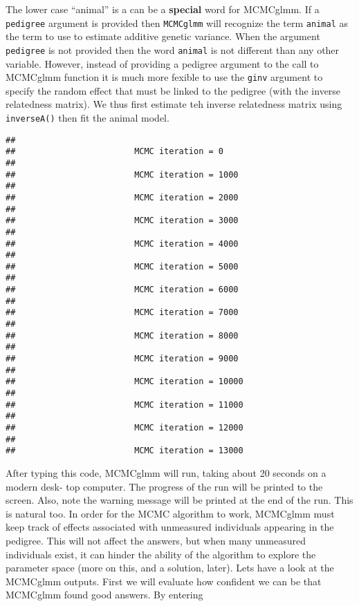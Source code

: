 \documentclass[
  12pt,
]{book}
\newenvironment{Shaded}{\begin{snugshade}}{\end{snugshade}}
\newcommand{\AttributeTok}[1]{\textcolor[rgb]{0.77,0.63,0.00}{#1}}
\newcommand{\DecValTok}[1]{\textcolor[rgb]{0.00,0.00,0.81}{#1}}
\newcommand{\FloatTok}[1]{\textcolor[rgb]{0.00,0.00,0.81}{#1}}
\newcommand{\FunctionTok}[1]{\textcolor[rgb]{0.00,0.00,0.00}{#1}}
\newcommand{\NormalTok}[1]{#1}
\newcommand{\OtherTok}[1]{\textcolor[rgb]{0.56,0.35,0.01}{#1}}
\newcommand{\SpecialCharTok}[1]{\textcolor[rgb]{0.00,0.00,0.00}{#1}}
\begin{document}
The lower case ``animal'' is a can be a \textbf{special} word for MCMCglmm. If a \texttt{pedigree} argument is provided then \texttt{MCMCglmm} will recognize the term \texttt{animal} as the term to use to estimate additive genetic variance. When the argument \texttt{pedigree} is not provided then the word \texttt{animal} is not different than any other variable. However, instead of providing a pedigree argument to the call to MCMCglmm function it is much more fexible to use the \texttt{ginv} argument to specify the random effect that must be linked to the pedigree (with the inverse relatedness matrix). We thus first estimate teh inverse relatedness matrix using \texttt{inverseA()} then fit the animal model.

\begin{Shaded}
\end{Shaded}

\begin{verbatim}
## 
##                        MCMC iteration = 0
## 
##                        MCMC iteration = 1000
## 
##                        MCMC iteration = 2000
## 
##                        MCMC iteration = 3000
## 
##                        MCMC iteration = 4000
## 
##                        MCMC iteration = 5000
## 
##                        MCMC iteration = 6000
## 
##                        MCMC iteration = 7000
## 
##                        MCMC iteration = 8000
## 
##                        MCMC iteration = 9000
## 
##                        MCMC iteration = 10000
## 
##                        MCMC iteration = 11000
## 
##                        MCMC iteration = 12000
## 
##                        MCMC iteration = 13000
\end{verbatim}

After typing this code, MCMCglmm will run, taking about 20 seconds on a modern desk- top computer. The progress of the run will be printed to the screen. Also, note the warning message will be printed at the end of the run. This is natural too. In order for the MCMC algorithm to work, MCMCglmm must keep track of effects associated with unmeasured individuals appearing in the pedigree. This will not affect the answers, but when many unmeasured individuals exist, it can hinder the ability of the algorithm to explore the parameter space (more on this, and a solution, later). Lets have a look at the MCMCglmm outputs. First we will evaluate how confident we can be that MCMCglmm found good answers. By entering
\end{document}
